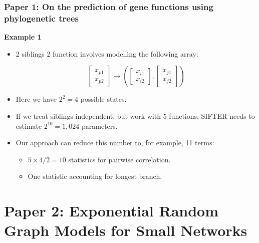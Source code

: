 \documentclass[aspectratio=169, 9pt]{beamer}\usepackage[]{graphicx}\usepackage[]{color}
\begin{document}
\begin{frame}[t]
\frametitle{Paper 1: On the prediction of gene functions using phylogenetic trees}

\textbf{Example 1}\pause
\begin{itemize}[<+->]
\item 2 siblings 2 function involves modelling the following array:

$$
\left[\begin{array}{c}x_{p1}\\x_{p2}\end{array}\right] \to
\left(%
\left[\begin{array}{c} x_{i1} \\ x_{i2}\end{array}\right],%
\left[\begin{array}{c} x_{j1} \\ x_{j2}\end{array}\right]
\right)
$$
\item Here we have $2^2 = 4$ possible states.
\end{itemize}


\begin{itemize}[<+->]
\item If we treat siblings independent, but work with 5 functions, SIFTER needs
to estimate $2^{10} = 1,024$ parameters.

\item Our approach can reduce this number to, for example, 11 terms:
\begin{itemize}
\item $5\times 4 / 2 = 10$ statistics for pairwise correlation.
\item One statistic accounting for longest branch.
\end{itemize}
\end{itemize}

\end{frame}

\section{Paper 2: Exponential Random Graph Models for Small Networks}

\end{document}

